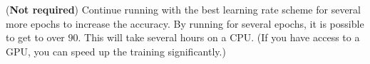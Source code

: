 \documentclass[11pt]{article}
\begin{document}
\begin{Parts}
\begin{tcolorbox}[breakable]
\end{tcolorbox}

\Part ({\bf Not required}) 
Continue running with the best learning rate scheme for several more epochs to increase the accuracy.
By running for several epochs, it is possible to get to over $90$. This will take several hours on a CPU. 
(If you have access to a GPU, you can speed up the training significantly.)

\begin{tcolorbox}[breakable]
\end{tcolorbox}

\end{Parts}
\end{document}
